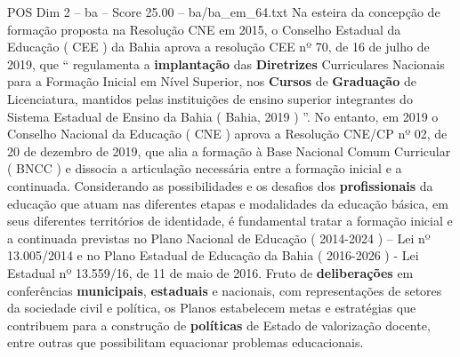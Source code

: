 \begin{textsample}{POS Dim 2 – ba – Score 25.00 – ba/ba\_em\_64.txt}
Na esteira da concepção de formação proposta na Resolução CNE em 2015, o Conselho Estadual da Educação ( CEE ) da Bahia aprova a resolução CEE nº 70, de 16 de julho de 2019, que “ regulamenta a \textbf{implantação} das \textbf{Diretrizes} Curriculares Nacionais para a Formação Inicial em Nível Superior, nos \textbf{Cursos} de \textbf{Graduação} de Licenciatura, mantidos pelas instituições de ensino superior integrantes do Sistema Estadual de Ensino da Bahia ( Bahia, 2019 ) ”.
No entanto, em 2019 o Conselho Nacional da Educação ( CNE ) aprova a Resolução CNE/CP nº 02, de 20 de dezembro de 2019, que alia a formação à Base Nacional Comum Curricular ( BNCC ) e dissocia a articulação necessária entre a formação inicial e a continuada.
Considerando as possibilidades e os desafios dos \textbf{profissionais} da educação que atuam nas diferentes etapas e modalidades da educação básica, em seus diferentes territórios de identidade, é fundamental tratar a formação inicial e a continuada previstas no Plano Nacional de Educação ( 2014-2024 ) – Lei nº 13.005/2014 e no Plano Estadual de Educação da Bahia ( 2016-2026 ) - Lei Estadual nº 13.559/16, de 11 de maio de 2016.
Fruto de \textbf{deliberações} em conferências \textbf{municipais}, \textbf{estaduais} e nacionais, com representações de setores da sociedade civil e política, os Planos estabelecem metas e estratégias que contribuem para a construção de \textbf{políticas} de Estado de valorização docente, entre outras que possibilitam equacionar problemas educacionais.

\end{textsample}
